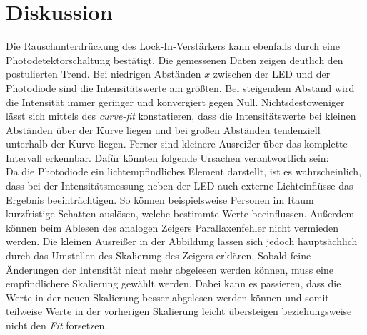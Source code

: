


\section{Diskussion}
\label{sec:Diskussion}

Die Rauschunterdrückung des Lock-In-Verstärkers kann ebenfalls durch eine Photodetektorschaltung bestätigt. 
Die gemessenen Daten zeigen deutlich den postulierten Trend. Bei niedrigen Abständen $x$ zwischen der LED und 
der Photodiode sind die Intensitätswerte am größten. Bei steigendem Abstand wird die Intensität immer geringer 
und konvergiert gegen Null.
Nichtsdestoweniger lässt sich mittels des \emph{curve-fit} konstatieren, dass die Intensitätswerte bei kleinen 
Abständen über der Kurve liegen und bei großen Abständen tendenziell unterhalb der Kurve liegen. Ferner sind 
kleinere Ausreißer über das komplette Intervall erkennbar. Dafür könnten folgende Ursachen verantwortlich sein:\\
Da die Photodiode ein lichtempfindliches Element darstellt, ist es wahrscheinlich, dass bei der Intensitätsmessung
neben der LED auch externe Lichteinflüsse das Ergebnis beeinträchtigen. So können beispielsweise Personen im Raum 
kurzfristige Schatten auslösen, welche bestimmte Werte beeinflussen. Außerdem können beim Ablesen des analogen 
Zeigers Parallaxenfehler nicht vermieden werden. Die kleinen Ausreißer in der Abbildung lassen sich jedoch 
hauptsächlich durch das Umstellen des Skalierung des Zeigers erklären. Sobald feine Änderungen der Intensität nicht 
mehr abgelesen werden können, muss eine empfindlichere Skalierung gewählt werden. Dabei kann es passieren, dass die 
Werte in der neuen Skalierung besser abgelesen werden können und somit teilweise Werte in der vorherigen Skalierung
leicht übersteigen beziehungsweise nicht den \emph{Fit} forsetzen. 

